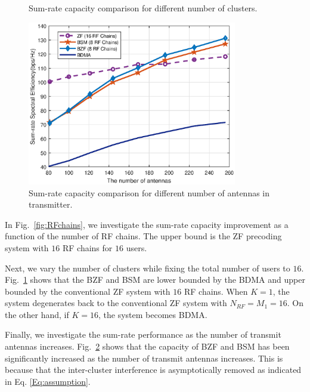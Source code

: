 \documentclass[conference]{IEEEtran}
\begin{document}
{\begin{figure}[ht]
\begin{center}
		\caption{Sum-rate capacity comparison for different number of clusters.}\label{fig:differentK}
	\end{center}
\end{figure}
\begin{figure}[ht] 
	\begin{center}
		\includegraphics[width=3.6in]{Figure/antenna1path.eps}
		\caption{Sum-rate capacity comparison for different number of antennas in transmitter.}\label{fig:CDF}
	\end{center}
\end{figure}

In Fig.~\ref{fig:RFchains}, we investigate the sum-rate capacity improvement as a function of the number of RF chains. The upper bound is the ZF precoding system with $16$ RF chains for $16$ users. 

Next, we vary the number of clusters while fixing the total number of users to $16$. Fig.~\ref{fig:differentK} shows that the BZF and BSM are lower bounded by the BDMA and upper bounded by the conventional ZF system with $16$ RF chains. When $K=1$, the system degenerates back to the conventional ZF system with $N_{RF}=M_1=16$. On the other hand, if $K=16$, the system becomes BDMA.

Finally, we investigate the sum-rate performance as the number of transmit antennas increases. Fig.~\ref{fig:CDF} shows that the capacity of BZF and BSM has been significantly increased as the number of transmit antennas increases. This is because that the inter-cluster interference is asymptotically removed as indicated in Eq. \eqref{Eq:assumption}.

}
\end{document}
